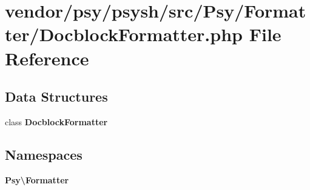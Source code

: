 \section{vendor/psy/psysh/src/\+Psy/\+Formatter/\+Docblock\+Formatter.php File Reference}
\label{_docblock_formatter_8php}
\subsection*{Data Structures}
\begin{DoxyCompactItemize}
\item 
class {\bf Docblock\+Formatter}
\end{DoxyCompactItemize}
\subsection*{Namespaces}
\begin{DoxyCompactItemize}
\item 
 {\bf Psy\textbackslash{}\+Formatter}
\end{DoxyCompactItemize}
